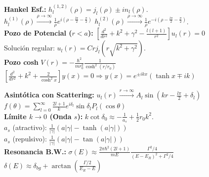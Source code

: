 \textbf{Hankel Esf.:} $h_l^{(1,2)}(\rho) = j_l(\rho) \pm i n_l(\rho)$. \\
$h_l^{(1)}(\rho) \xrightarrow{\rho \to \infty} \frac{1}{\rho} e^{i(\rho - \frac{l\pi}{2} - \frac{\pi}{2})}$ \;\; 
$h_l^{(2)}(\rho) \xrightarrow{\rho \to \infty} \frac{1}{\rho} e^{-i(\rho - \frac{l\pi}{2} - \frac{\pi}{2})}$. \\

\textbf{Pozo de Potencial ($r < a$):} $\left[\frac{d^2}{dr^2} + k^2 + \gamma^2 - \frac{l(l+1)}{r^2}\right] u_l(r) = 0$ \\
Solución regular: $u_l(r) = C r j_l(r\sqrt{k^2+\gamma^2})$. \\

\textbf{Pozo cosh} $V(r) = -\frac{\hbar^2}{mr_0^2}\frac{1}{\cosh^2(r/r_0)}$ $[\frac{d^2}{dr^2}+ k^2+\frac{2}{\cosh^2 x}] y(x) = 0\Rightarrow y(x)=e^{\pm ikx} (\tanh x \mp ik)$

\textbf{Asintótica con Scattering:} $u_l(r) \xrightarrow{r \to \infty} A_l \sin\left(kr - \frac{l\pi}{2} + \delta_l\right)$ \\
$f(\theta) = \sum_{l=0}^{\infty} \frac{2l+1}{k} e^{i\delta_l} \sin\delta_l P_l(\cos\theta)$ \\

\textbf{Límite $k \to 0$ (Onda $s$):} $k \cot\delta_0 \approx -\frac{1}{a_s} + \frac{1}{2}r_0 k^2$. \\
$a_s$ (atractivo): $\frac{1}{|\gamma|}(a|\gamma| - \tanh(a|\gamma|))$ \\
$a_s$ (repulsivo): $\frac{1}{|\gamma|}(a|\gamma| - \tan(a|\gamma|))$ \\

\textbf{Resonancia B.W.:} $\sigma(E) \approx \frac{2\pi\hbar^2(2l+1)}{mE} \frac{\Gamma^2/4}{(E-E_R)^2 + \Gamma^2/4}$\;\;
$\delta(E) \approx \delta_{bg} + \arctan\left(\frac{\Gamma/2}{E_R - E}\right)$



